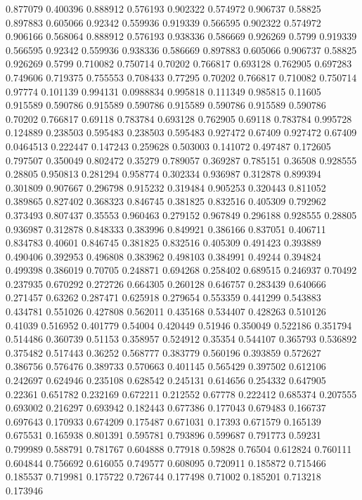 0.877079 0.400396
0.888912 0.576193
0.902322 0.574972
0.906737 0.58825
0.897883 0.605066
0.92342 0.559936
0.919339 0.566595
0.902322 0.574972
0.906166 0.568064
0.888912 0.576193
0.938336 0.586669
0.926269 0.5799
0.919339 0.566595
0.92342 0.559936
0.938336 0.586669
0.897883 0.605066
0.906737 0.58825
0.926269 0.5799
0.710082 0.750714
0.70202 0.766817
0.693128 0.762905
0.697283 0.749606
0.719375 0.755553
0.708433 0.77295
0.70202 0.766817
0.710082 0.750714
0.97774 0.101139
0.994131 0.0988834
0.995818 0.111349
0.985815 0.11605
0.915589 0.590786
0.915589 0.590786
0.915589 0.590786
0.915589 0.590786
0.70202 0.766817
0.69118 0.783784
0.693128 0.762905
0.69118 0.783784
0.995728 0.124889
0.238503 0.595483
0.238503 0.595483
0.927472 0.67409
0.927472 0.67409
0.0464513 0.222447
0.147243 0.259628
0.503003 0.141072
0.497487 0.172605
0.797507 0.350049
0.802472 0.35279
0.789057 0.369287
0.785151 0.36508
0.928555 0.28805
0.950813 0.281294
0.958774 0.302334
0.936987 0.312878
0.899394 0.301809
0.907667 0.296798
0.915232 0.319484
0.905253 0.320443
0.811052 0.389865
0.827402 0.368323
0.846745 0.381825
0.832516 0.405309
0.792962 0.373493
0.807437 0.35553
0.960463 0.279152
0.967849 0.296188
0.928555 0.28805
0.936987 0.312878
0.848333 0.383996
0.849921 0.386166
0.837051 0.406711
0.834783 0.40601
0.846745 0.381825
0.832516 0.405309
0.491423 0.393889
0.490406 0.392953
0.496808 0.383962
0.498103 0.384991
0.49244 0.394824
0.499398 0.386019
0.70705 0.248871
0.694268 0.258402
0.689515 0.246937
0.70492 0.237935
0.670292 0.272726
0.664305 0.260128
0.646757 0.283439
0.640666 0.271457
0.63262 0.287471
0.625918 0.279654
0.553359 0.441299
0.543883 0.434781
0.551026 0.427808
0.562011 0.435168
0.534407 0.428263
0.510126 0.41039
0.516952 0.401779
0.54004 0.420449
0.51946 0.350049
0.522186 0.351794
0.514486 0.360739
0.51153 0.358957
0.524912 0.35354
0.544107 0.365793
0.536892 0.375482
0.517443 0.36252
0.568777 0.383779
0.560196 0.393859
0.572627 0.386756
0.576476 0.389733
0.570663 0.401145
0.565429 0.397502
0.612106 0.242697
0.624946 0.235108
0.628542 0.245131
0.614656 0.254332
0.647905 0.22361
0.651782 0.232169
0.672211 0.212552
0.67778 0.222412
0.685374 0.207555
0.693002 0.216297
0.693942 0.182443
0.677386 0.177043
0.679483 0.166737
0.697643 0.170933
0.674209 0.175487
0.671031 0.17393
0.671579 0.165139
0.675531 0.165938
0.801391 0.595781
0.793896 0.599687
0.791773 0.59231
0.799989 0.588791
0.781767 0.604888
0.77918 0.59828
0.76504 0.612824
0.760111 0.604844
0.756692 0.616055
0.749577 0.608095
0.720911 0.185872
0.715466 0.185537
0.719981 0.175722
0.726744 0.177498
0.71002 0.185201
0.713218 0.173946

